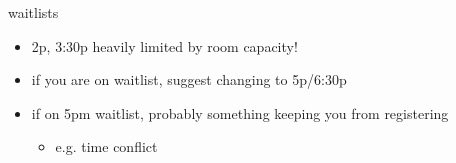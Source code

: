 \begin{frame}{waitlists}
    \begin{itemize}
    \item 2p, 3:30p heavily limited by room capacity!
    \item if you are on waitlist, suggest changing to 5p/6:30p
    \vspace{.5cm}
    \item if on 5pm waitlist, probably something keeping you from registering
        \begin{itemize}
        \item e.g. time conflict
        \end{itemize}
    \end{itemize}
\end{frame}
